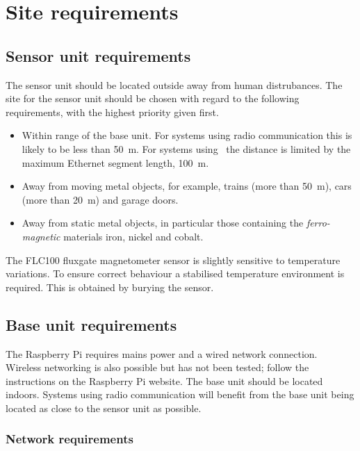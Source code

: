 \chapter{Site requirements}

\section{Sensor unit requirements}
The sensor unit should be located outside away from human
distrubances. The site for the sensor unit should be chosen with
regard to the following requirements, with the highest priority given
first.

\begin{itemize}
\item Within range of the base unit. For systems using radio
  communication this is likely to be less than \SI{50}{\metre}. For
  systems using \PoE\ the distance is limited by the maximum Ethernet
  segment length, \SI{100}{\metre}.
\item Away from moving metal objects, for example, trains (more than
  \SI{50}{\metre}), cars (more than \SI{20}{\metre}) and garage doors.
\item Away from static metal objects, in particular those containing
  the \emph{ferro-magnetic} materials iron, nickel and cobalt.
\end{itemize}

The FLC100 fluxgate magnetometer sensor is slightly sensitive to
temperature variations. To ensure correct behaviour a stabilised
temperature environment is required. This is obtained by burying the
sensor.

\section{Base unit requirements}

The Raspberry Pi requires mains power and a wired network
connection. Wireless networking is also possible but has not been
tested; follow the instructions on the Raspberry Pi website. The base
unit should be located indoors. Systems using radio communication will
benefit from the base unit being located as close to the sensor unit
as possible.

\subsection{Network requirements}

